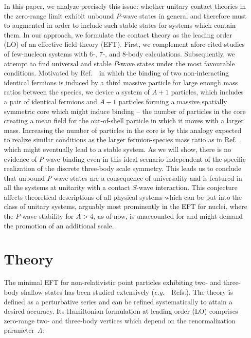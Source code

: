 \documentclass[preprint,12pt]{elsarticle}
\newcommand{\eg}{\textit{e.g.}~}
\begin{document}
In this paper, we analyze precisely this issue: whether unitary contact theories in the zero-range limit exhibit unbound $P$-wave
states in general and therefore must to augmented in order to include such stable states for systems which contain them.
In our approach, we formulate the contact theory as the leading order (LO) of an effective field theory (EFT). 
First, we complement afore-cited studies of few-nucleon systems with 6-, 7-, and 8-body calculations.
Subsequently, we attempt to find universal and stable $P$-wave states under the most favourable conditions.
Motivated by Ref.~\cite{Kartavtsev_2007}~in which the binding of two non-interacting identical fermions is induced by a third massive particle
for large enough mass ratios between the species,
we device a system of $A+1$ particles, which includes a pair of identical fermions and $A-1$ particles forming a
massive spatially symmetric core which might induce binding -- the number of particles in the core creating a mean field for the out-of-shell
particle in which it moves with a larger mass.
Increasing the number of particles in the core is by this analogy expected to realize similar conditions as the larger fermion-species
mass ratio as in Ref.~\cite{Kartavtsev_2007}, which might eventually lead to a stable system.
As we will show, there is no evidence of $P$-wave binding even in this ideal scenario independent of the specific
realization of the discrete three-body scale symmetry.
This leads us to conclude that unbound $P$-wave states are a consequence of universality and is featured in all the systems
at unitarity with a contact $S$-wave interaction.
This conjecture affects theoretical descriptions of all physical systems which can be put into the class of unitary systems, arguably
most prominently in the EFT for nuclei, where the $P$-wave stability for $A>4$, as of now, is unaccounted for and might demand
the promotion of an additional scale.

\section*{Theory}
The minimal EFT for non-relativistic point particles exhibiting two- and three-body shallow states has been studied extensively (\eg~Refs.\cite{Lepage:1997cs,vanKolck:1999mw, Bedaque:1998kg, Braaten:2004rn, Hammer:2017tjm, Hammer:2019poc}).
The theory is defined as a perturbative series and can be refined systematically to attain a desired accuracy.
Its Hamiltonian formulation at leading order (LO) comprises zero-range two- and three-body vertices which depend on the renormalization parameter~$\Lambda$:
\end{document}
